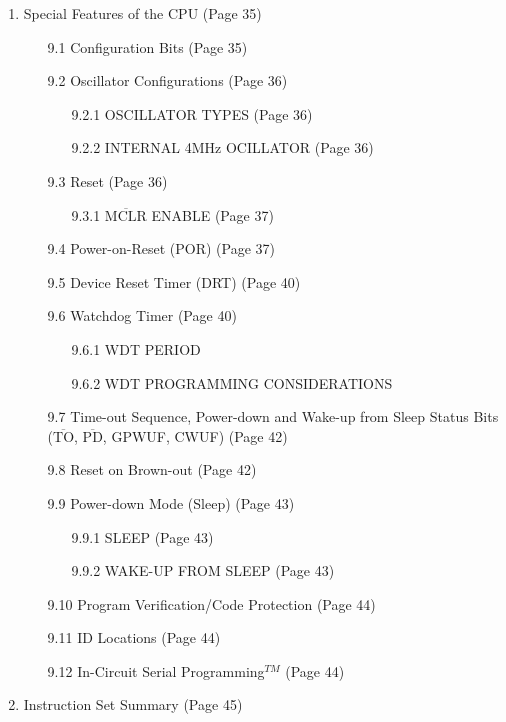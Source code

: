 \documentclass[12pt, letterpaper]{article}
\begin{document}
\begin{enumerate}
  \item Special Features of the CPU (Page 35)
  \begin{enumerate}
    \item [9.1] Configuration Bits (Page 35)
    \item [9.2] Oscillator Configurations (Page 36)
    \begin{enumerate}
      \item [9.2.1] OSCILLATOR TYPES (Page 36)
      \item [9.2.2] INTERNAL 4MHz OCILLATOR (Page 36)
    \end{enumerate}
    \item [9.3] Reset (Page 36)
    \begin{enumerate}
      \item [9.3.1] $\overline{\text{MCLR}}$ ENABLE (Page 37)
    \end{enumerate}
    \item [9.4] Power-on-Reset (POR) (Page 37)
    \item [9.5] Device Reset Timer (DRT) (Page 40)
    \item [9.6] Watchdog Timer (Page 40)
    \begin{enumerate}
      \item [9.6.1] WDT PERIOD
      \item [9.6.2] WDT PROGRAMMING CONSIDERATIONS
    \end{enumerate}
    \item [9.7] Time-out Sequence, Power-down and Wake-up from Sleep Status Bits ($\overline{\text{TO}}$, $\overline{\text{PD}}$, GPWUF, CWUF) (Page 42)
    \item [9.8] Reset on Brown-out (Page 42)
    \item [9.9] Power-down Mode (Sleep) (Page 43)
    \begin{enumerate}
      \item [9.9.1] SLEEP (Page 43)
      \item [9.9.2] WAKE-UP FROM SLEEP (Page 43)
    \end{enumerate}
    \item [9.10] Program Verification/Code Protection (Page 44)
    \item [9.11] ID Locations (Page 44)
    \item [9.12] In-Circuit Serial Programming$^{TM}$ (Page 44)
  \end{enumerate}

  \item Instruction Set Summary (Page 45)


\end{enumerate}
\end{document}
